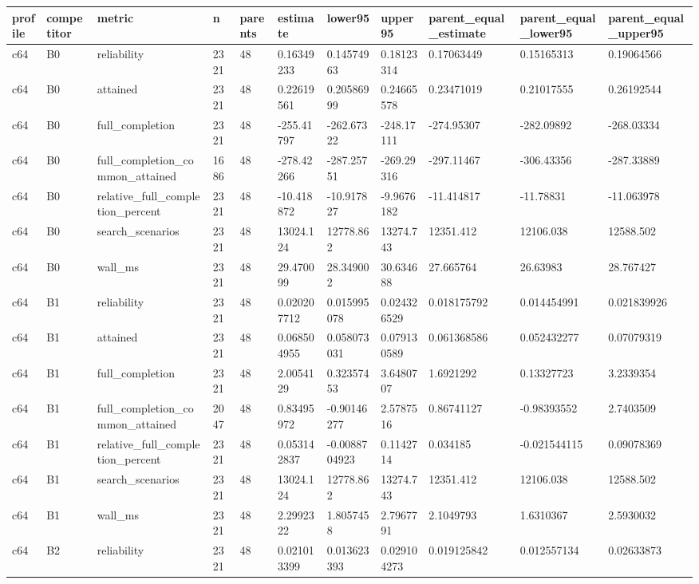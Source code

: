 \begin{longtable}{lllllllllll}
\hline
profile & competitor & metric & n & parents & estimate & lower95 & upper95 & parent\_equal\_estimate & parent\_equal\_lower95 & parent\_equal\_upper95 \\
\hline
c64 & B0 & reliability & 2321 & 48 & 0.16349233 & 0.14574963 & 0.18123314 & 0.17063449 & 0.15165313 & 0.19064566 \\
c64 & B0 & attained & 2321 & 48 & 0.22619561 & 0.20586999 & 0.24665578 & 0.23471019 & 0.21017555 & 0.26192544 \\
c64 & B0 & full\_completion & 2321 & 48 & -255.41797 & -262.67322 & -248.17111 & -274.95307 & -282.09892 & -268.03334 \\
c64 & B0 & full\_completion\_common\_attained & 1686 & 48 & -278.42266 & -287.25751 & -269.29316 & -297.11467 & -306.43356 & -287.33889 \\
c64 & B0 & relative\_full\_completion\_percent & 2321 & 48 & -10.418872 & -10.917827 & -9.9676182 & -11.414817 & -11.78831 & -11.063978 \\
c64 & B0 & search\_scenarios & 2321 & 48 & 13024.124 & 12778.862 & 13274.743 & 12351.412 & 12106.038 & 12588.502 \\
c64 & B0 & wall\_ms & 2321 & 48 & 29.470099 & 28.349002 & 30.634688 & 27.665764 & 26.63983 & 28.767427 \\
c64 & B1 & reliability & 2321 & 48 & 0.020207712 & 0.015995078 & 0.024326529 & 0.018175792 & 0.014454991 & 0.021839926 \\
c64 & B1 & attained & 2321 & 48 & 0.068504955 & 0.058073031 & 0.079130589 & 0.061368586 & 0.052432277 & 0.07079319 \\
c64 & B1 & full\_completion & 2321 & 48 & 2.0054129 & 0.32357453 & 3.6480707 & 1.6921292 & 0.13327723 & 3.2339354 \\
c64 & B1 & full\_completion\_common\_attained & 2047 & 48 & 0.83495972 & -0.90146277 & 2.5787516 & 0.86741127 & -0.98393552 & 2.7403509 \\
c64 & B1 & relative\_full\_completion\_percent & 2321 & 48 & 0.053142837 & -0.0088704923 & 0.1142714 & 0.034185 & -0.021544115 & 0.09078369 \\
c64 & B1 & search\_scenarios & 2321 & 48 & 13024.124 & 12778.862 & 13274.743 & 12351.412 & 12106.038 & 12588.502 \\
c64 & B1 & wall\_ms & 2321 & 48 & 2.2992322 & 1.8057458 & 2.7967791 & 2.1049793 & 1.6310367 & 2.5930032 \\
c64 & B2 & reliability & 2321 & 48 & 0.021013399 & 0.013623393 & 0.029104273 & 0.019125842 & 0.012557134 & 0.02633873 \\

\end{longtable}
